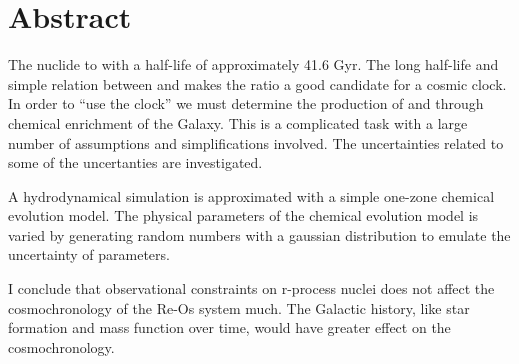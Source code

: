 \section*{Abstract}
The nuclide  \betadecays to  with a half-life of approximately 41.6 Gyr.
The long half-life and simple relation between  and  makes the ratio a good candidate for a cosmic clock.
In order to ``use the clock'' we must determine the production of  and  through chemical enrichment of the Galaxy.
This is a complicated task with a large number of assumptions and simplifications involved.
The uncertainties related to some of the uncertanties are investigated.

A hydrodynamical simulation is approximated with a simple one-zone chemical evolution model.
The physical parameters of the chemical evolution model is varied by generating random numbers with a gaussian distribution to emulate the uncertainty of parameters.

I conclude that observational constraints on r-process nuclei does not affect the cosmochronology of the Re-Os system much.
The Galactic history, like star formation and mass function over time, would have greater effect on the cosmochronology.
\newpage
